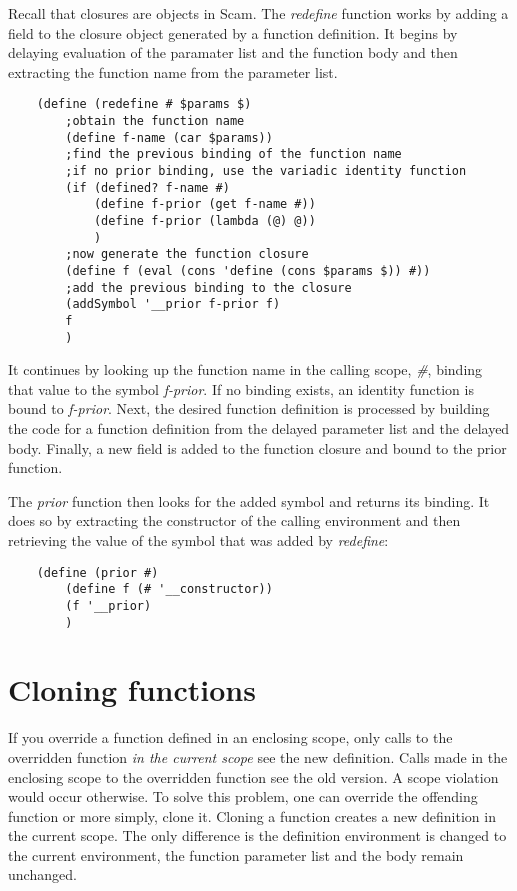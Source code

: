 Recall that closures are objects in Scam.
The {\it redefine} function works by adding a field to the closure
object generated by a function definition. It begins by
delaying evaluation of the paramater list and the function
body and then extracting the function name from the parameter list.

\begin{verbatim}
    (define (redefine # $params $)
        ;obtain the function name
        (define f-name (car $params))
        ;find the previous binding of the function name
        ;if no prior binding, use the variadic identity function 
        (if (defined? f-name #)
            (define f-prior (get f-name #))
            (define f-prior (lambda (@) @))
            )
        ;now generate the function closure
        (define f (eval (cons 'define (cons $params $)) #))
        ;add the previous binding to the closure
        (addSymbol '__prior f-prior f)
        f
        )
\end{verbatim}

It continues by looking up the function name in the calling scope, {\it \#},
binding that value to the symbol {\it f-prior}. If no binding exists,
an identity function is bound to {\it f-prior}.
Next, the desired function definition is processed by building
the code for a function definition from the delayed parameter list
and the delayed body.
Finally, a new field is added to the function closure and bound
to the prior function.

The {\it prior} function then looks for the added symbol and returns
its binding. It does so by extracting the constructor of the calling
environment and then retrieving the value of the symbol that was 
added by {\it redefine}:

\begin{verbatim}
    (define (prior #)
        (define f (# '__constructor))
        (f '__prior)
        )
\end{verbatim}

\section{Cloning functions}

If you override a function defined in an enclosing scope, only calls
to
the overridden function {\it in the current scope} see the new definition.
Calls made in the enclosing scope to the overridden function
see the old version. A scope violation would occur otherwise.
To solve this problem, one can override the offending function
or more simply, clone it. Cloning a function creates a new
definition in the current scope. The only difference is the
definition environment is changed to the current environment,
the function parameter list and the body remain unchanged.

